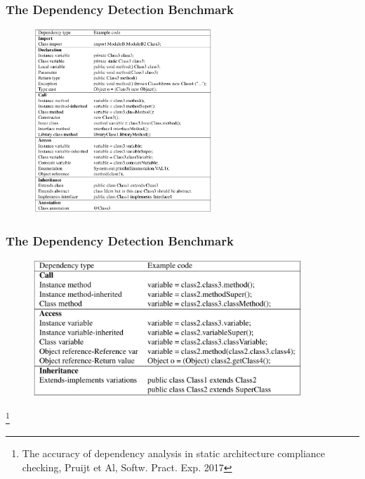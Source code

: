 \documentclass[dvipsnames, 10pt, table]{beamer}
\begin{document}
\begin{frame}
  \frametitle{The Dependency Detection Benchmark}
  \begin{figure}
    \begin{center}
      \includegraphics[width=0.6\textwidth]{figures/testing/benchmark-table-1.png}
    \end{center}
  \end{figure}
\end{frame}

\begin{frame}
  \frametitle{The Dependency Detection Benchmark}
  \begin{figure}
    \begin{center}
      \includegraphics[width=0.9\textwidth]{figures/testing/benchmark-table-2.png}
    \end{center}
  \end{figure}
	\footnote{The accuracy of dependency analysis in static architecture compliance checking, Pruijt et Al, Softw. Pract. Exp. 2017}
\end{frame}
\end{document}
